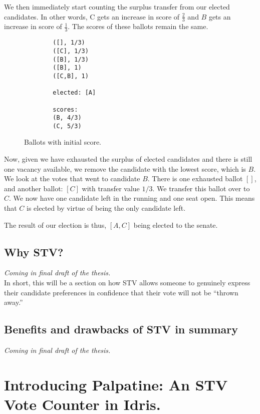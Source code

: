 We then immediately start counting the surplus transfer from our elected candidates. In other words, C gets an increase in score of $\frac{2}{3}$ and $B$ gets an increase in score of $\frac{1}{3}$. The scores of these ballots remain the same. 

\begin{figure}[ht!!!!!!!!]
    \caption{Ballots with initial score.}
    \label{sample_election3}
    \begin{lstlisting}
        ([], 1/3)
        ([C], 1/3)
        ([B], 1/3)
        ([B], 1)
        ([C,B], 1)
        
        elected: [A]
        
        scores: 
        (B, 4/3)
        (C, 5/3)
    \end{lstlisting}
\end{figure}

Now, given we have exhausted the surplus of elected candidates and there is
still one vacancy available, we remove the candidate with the lowest score,
which is $B$. We look at the votes that went to candidate $B$. There is one
exhausted ballot $[]$, and another ballot: $[C]$ with transfer value $1/3$. We
transfer this ballot over to $C$. We now have one candidate left in the running
and one seat open. This means that $C$ is elected by virtue of being the only
candidate left. 

The result of our election is thus, $[A,C]$ being elected to the senate.  

\section{Why STV?}
\textit{Coming in final draft of the thesis.} \\
In short, this will be a section on how STV allows someone to genuinely express
their candidate preferences in confidence that their vote will not be ``thrown
away.''

\section{Benefits and drawbacks of STV in summary}
\textit{Coming in final draft of the thesis.}



\chapter{Introducing Palpatine: An STV Vote Counter in Idris.}

